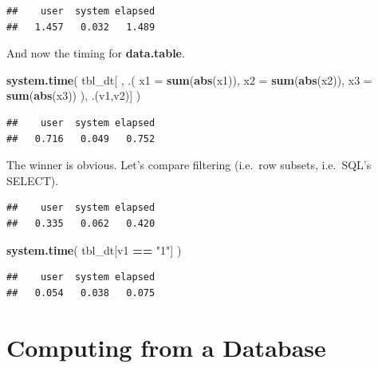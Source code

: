 \documentclass[]{book}
\newenvironment{Shaded}{\begin{snugshade}}{\end{snugshade}}
\newcommand{\DataTypeTok}[1]{\textcolor[rgb]{0.13,0.29,0.53}{#1}}
\newcommand{\KeywordTok}[1]{\textcolor[rgb]{0.13,0.29,0.53}{\textbf{#1}}}
\newcommand{\NormalTok}[1]{#1}
\newcommand{\OperatorTok}[1]{\textcolor[rgb]{0.81,0.36,0.00}{\textbf{#1}}}
\newcommand{\StringTok}[1]{\textcolor[rgb]{0.31,0.60,0.02}{#1}}
\theoremstyle{definition}
\theoremstyle{definition}
\theoremstyle{definition}
\theoremstyle{remark}
\begin{document}
\begin{verbatim}
##    user  system elapsed 
##   1.457   0.032   1.489
\end{verbatim}

And now the timing for \textbf{data.table}.

\begin{Shaded}
\begin{Highlighting}[]
\KeywordTok{system.time}\NormalTok{( }
\NormalTok{  tbl_dt[ ,  .( }\DataTypeTok{x1 =} \KeywordTok{sum}\NormalTok{(}\KeywordTok{abs}\NormalTok{(x1)), }\DataTypeTok{x2 =} \KeywordTok{sum}\NormalTok{(}\KeywordTok{abs}\NormalTok{(x2)), }\DataTypeTok{x3 =} \KeywordTok{sum}\NormalTok{(}\KeywordTok{abs}\NormalTok{(x3)) ), .(v1,v2)]}
\NormalTok{  )}
\end{Highlighting}
\end{Shaded}

\begin{verbatim}
##    user  system elapsed 
##   0.716   0.049   0.752
\end{verbatim}

The winner is obvious.
Let's compare filtering (i.e.~row subsets, i.e.~SQL's SELECT).

\begin{Shaded}
\end{Shaded}

\begin{verbatim}
##    user  system elapsed 
##   0.335   0.062   0.420
\end{verbatim}

\begin{Shaded}
\begin{Highlighting}[]
\KeywordTok{system.time}\NormalTok{( }
\NormalTok{  tbl_dt[v1 }\OperatorTok{==}\StringTok{ "1"}\NormalTok{] }
\NormalTok{  )}
\end{Highlighting}
\end{Shaded}

\begin{verbatim}
##    user  system elapsed 
##   0.054   0.038   0.075
\end{verbatim}

\hypertarget{computing-from-a-database}{%
\section{Computing from a Database}\label{computing-from-a-database}}
\end{document}

